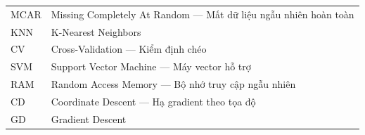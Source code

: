 \documentclass[oneside]{styles/hcmus-report}
\begin{document}
\begin{longtable}{p{} p{}}
MCAR & Missing Completely At Random --- Mất dữ liệu ngẫu nhiên hoàn toàn \\
KNN  & K-Nearest Neighbors \\
CV   & Cross-Validation --- Kiểm định chéo \\

SVM  & Support Vector Machine --- Máy vector hỗ trợ \\
RAM  & Random Access Memory --- Bộ nhớ truy cập ngẫu nhiên \\
CD   & Coordinate Descent --- Hạ gradient theo tọa độ \\
GD   & Gradient Descent \\
\end{longtable}


\clearpage
{}






\clearpage

{}



\nocite{*}
\end{document}

